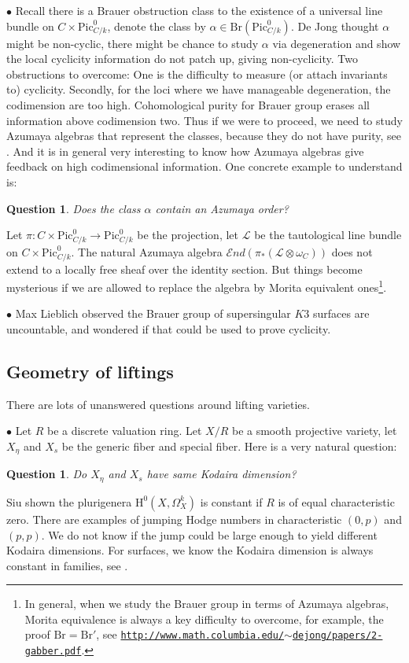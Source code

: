 \documentclass[8pt]{amsart}
\newtheorem{question}[theorem]{Question}
\begin{document}
$\bullet$ Recall there is a Brauer obstruction class to the existence of a universal line bundle on $C\times\mathrm{Pic}^0_{C/k}$, denote the class by $\alpha\in\mathrm{Br}(\mathrm{Pic}^0_{C/k})$. De Jong thought $\alpha$ might be non-cyclic, there might be chance to study $\alpha$ via degeneration and show the local cyclicity information do not patch up, giving non-cyclicity. Two obstructions to overcome: One is the difficulty to measure (or attach invariants to) cyclicity. Secondly, for the loci where we have manageable degeneration, the codimension are too high. Cohomological purity \cite{Purity2} for Brauer group erases all information above codimension two. Thus if we were to proceed, we need to study Azumaya algebras that represent the classes, because they do not have purity, see \cite{Ant}. And it is in general very interesting to know how Azumaya algebras give feedback on high codimensional information. One concrete example to understand is:
\begin{question}\label{2}Does the class $\alpha$ contain an Azumaya order?
\end{question}
Let $\pi\colon C\times\mathrm{Pic}^0_{C/k}\to\mathrm{Pic}^0_{C/k}$ be the projection, let $\mathcal{L}$ be the tautological line bundle on $C\times\mathrm{Pic}^0_{C/k}$. The natural Azumaya algebra $\mathcal{E}nd(\pi_*(\mathcal{L}\otimes\omega_C))$ does not extend to a locally free sheaf over the identity section. But things become mysterious if we are allowed to replace the algebra by Morita equivalent ones\footnote{In general, when we study the Brauer group in terms of Azumaya algebras, Morita equivalence is always a key difficulty to overcome, for example, the proof $\mathrm{Br}=\mathrm{Br}'$, see \href{http://www.math.columbia.edu/~dejong/papers/2-gabber.pdf}{\texttt{http://www.math.columbia.edu/$\sim$dejong/papers/2-gabber.pdf}}.}.

$\bullet$ Max Lieblich observed the Brauer group of supersingular $K3$ surfaces are uncountable, and wondered if that could be used to prove cyclicity.

\subsection{Geometry of liftings}
There are lots of unanswered questions around lifting varieties.

$\bullet$ Let $R$ be a discrete valuation ring. Let $X/R$ be a smooth projective variety, let $X_\eta$ and $X_s$ be the generic fiber and special fiber. Here is a very natural question:
\begin{question} Do $X_\eta$ and $X_s$ have same Kodaira dimension?
\end{question}
Siu shown the plurigenera $\mathrm{H}^0(X,\Omega_X^k)$ is constant if $R$ is of equal characteristic zero. There are examples of jumping Hodge numbers in characteristic $(0,p)$ and $(p,p)$. We do not know if the jump could be large enough to yield different Kodaira dimensions. For surfaces, we know the Kodaira dimension is always constant in families, see \cite{Hacon}.
\end{document}
